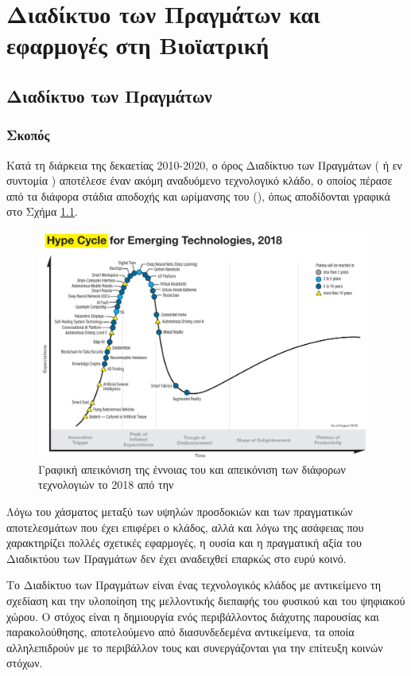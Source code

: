\chapter{Διαδίκτυο των Πραγμάτων και εφαρμογές στη Βιοϊατρική}
\label{chap1}
\section{Διαδίκτυο των Πραγμάτων}
\subsection{Σκοπός}
Κατά τη διάρκεια της δεκαετίας 2010-2020, ο όρος Διαδίκτυο των Πραγμάτων ( ή εν συντομία ) αποτέλεσε έναν ακόμη αναδυόμενο τεχνολογικό κλάδο, ο οποίος πέρασε από τα διάφορα στάδια αποδοχής και ωρίμανσης του (), όπως αποδίδονται γραφικά στο Σχήμα \ref{hc}.
\begin{figure}[h!]
\includegraphics[scale=0.3]{images/hype_cycle.png}
\centering
\caption{Γραφική απεικόνιση της έννοιας του  και απεικόνιση των διάφορων τεχνολογιών το 2018 από την  \cite{Gartner:HC}}	
\label{hc}
\end{figure}
Λόγω του χάσματος μεταξύ των υψηλών προσδοκιών και των πραγματικών αποτελεσμάτων που έχει επιφέρει ο κλάδος, αλλά και λόγω της ασάφειας που χαρακτηρίζει πολλές σχετικές εφαρμογές, η ουσία και η πραγματική αξία του Διαδικτύου των Πραγμάτων δεν έχει αναδειχθεί επαρκώς στο ευρύ κοινό.
\par
Το Διαδίκτυο των Πραγμάτων είναι ένας τεχνολογικός κλάδος με αντικείμενο τη σχεδίαση και την υλοποίηση της μελλοντικής διεπαφής του φυσικού και του ψηφιακού χώρου.
Ο στόχος είναι η δημιουργία ενός περιβάλλοντος διάχυτης παρουσίας και παρακολούθησης, αποτελούμενο από διασυνδεδεμένα αντικείμενα, τα οποία αλληλεπιδρούν με το περιβάλλον τους και συνεργάζονται για την επίτευξη κοινών στόχων. \cite{book:giusto}
